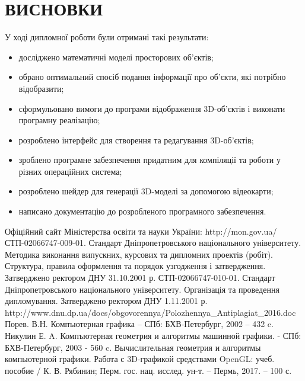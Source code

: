 \let\mypdfximage\pdfximage\def\pdfximage{\immediate\mypdfximage}\documentclass[14pt,a4paper]{extarticle}
\theoremstyle{definition}
\renewcommand{\[}{\begin{singlespace}\begin{equation*}}
\renewcommand{\]}{\end{equation*}\end{singlespace}}
\renewcommand{\+}{\discretionary{\mbox{\scriptsize$\hookleftarrow$}}{}{}}
\begin{document}









\section*{ВИСНОВКИ}
У ході дипломної роботи були отримані такі результати:

\begin{itemize}
\item досліджено математичні моделі просторових об'єктів;
\item обрано оптимальний спосіб подання інформації про об'єкти, які потрібно відобразити;
\item сформульовано вимоги до програми відображення 3D-об'єктів і виконати програмну реалізацію;
\item розроблено інтерфейс для створення та редагування 3D-об'єктів;
\item зроблено програмне забезпечення придатним для компіляції та роботи у різних операційних система;
\item розроблено шейдер для генерації 3D-моделі за допомогою відеокарти;
\item написано документацію до розробленого програмного забезпечення.
\end{itemize}

\begin{thebibliography}{9}
\bibitem{} Офіційний сайт Міністерства освіти та науки України: http://mon.gov.ua/
\bibitem{} СТП-02066747-009-01. Стандарт Дніпропетровського національного університету. Методика виконання випускних, курсових та дипломних проектів (робіт). Структура, правила оформлення та порядок узгодження і затвердження. Затверджено ректором ДНУ 31.10.2001 р.
\bibitem{} СТП-02066747-010-01. Стандарт Дніпропетровського національного університету. Організація та проведення дипломування. Затверджено ректором ДНУ 1.11.2001 р.
\bibitem{} http://www.dnu.dp.ua/docs/obgovorennya/Polozhennya\_Antiplagiat\_2016.doc
 Порев. В.Н. Компъютерная графика -- СПб: БХВ-Петербург, 2002 -- 432 c.
 Никулин Е. A. Компъютерная геометрия и алгоритмы машинной графики. - СПб: БХВ-Петербург, 2003 - 560 c.
 Вычислительная геометрия и алгоритмы компьютерной графики. Работа с 3D-графикой средствами OpenGL: учеб. пособие / К. В. Рябинин; Перм. гос. нац. исслед. ун-т. – Пермь, 2017. – 100 с.
\end{thebibliography}
\end{document}
